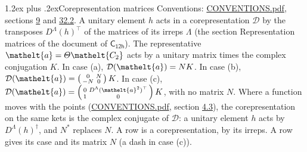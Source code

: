 \documentclass[10pt,a4paper]{article}
\makeatletter
\renewcommand\section{\@startsection{section}{1}{\z@}{-3ex plus -1ex minus -.2ex}%
  {1.2ex plus .2ex}{\normalfont\large\sffamily\bfseries\color{parttitle}}}
\numberwithin{equation}{section}
\newcommand{\eltfont}[1]{{\let\sigma\eltsigma\mathelt{#1}}}
\newcommand{\grp}[1]{\mathsf{#1}}
\newcommand{\elt}[1]{\eltfont{#1}}
\makeatother
\begin{document}
\section{Corepresentation matrices}\label{s:corep_matrices}
Conventions: \href{../../CONVENTIONS.pdf}{CONVENTIONS.pdf}, sections \href{../../../rotation/CONVENTIONS.pdf\#conv.9}{9} and \href{../../CONVENTIONS.pdf\#conv.32.2}{32.2}.
A unitary element $h$ acts in a corepresentation $\mathcal{D}$ by the transposes $D^{\Lambda}(h)^{\top}$ of the matrices of its irreps $\Lambda$ (the section Representation matrices of the document of \href{../../../rotation/data/pdf/C12h.pdf}{$\grp{C_{12h}}$}). The representative $\elt{a} = \varTheta\elt{C_{2}}$ acts by a unitary matrix times the complex conjugation $K$.
In case (a), $\mathcal{D}(\elt{a}) = NK$. In case (b), $\mathcal{D}(\elt{a}) = \left(\begin{smallmatrix} 0 & N \\ -N & 0 \end{smallmatrix}\right) K$. In case (c), $\mathcal{D}(\elt{a}) = \left(\begin{smallmatrix} 0 & D^{\Lambda}(\elt{a}^2)^{\top} \\ 1 & 0 \end{smallmatrix}\right) K$, with no matrix $N$.
Where a function moves with the points (\href{../../CONVENTIONS.pdf}{CONVENTIONS.pdf}, section \href{../../../rotation/CONVENTIONS.pdf\#conv.4.3}{4.3}), the corepresentation on the same kets is the complex conjugate of $\mathcal{D}$: a unitary element $h$ acts by $D^{\Lambda}(h)^{\dagger}$, and $N^{*}$ replaces $N$.
A row is a corepresentation, by its irreps. A row gives its case and its matrix $N$ (a dash in case (c)).
\end{document}
